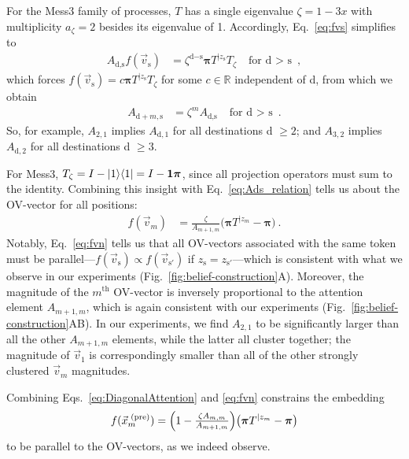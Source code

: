 \documentclass{article}
\theoremstyle{plain}
\theoremstyle{definition}
\theoremstyle{remark}
\newcommand{\stationary}{\boldsymbol{\pi}}
\begin{document}
For the Mess3 family of processes,
$T$ has a single eigenvalue $\zeta = 1-3x$
with multiplicity $a_\zeta = 2$
besides its eigenvalue of 1.
Accordingly, 
Eq.~\eqref{eq:fvs} simplifies to
\begin{align}
A_{\text{d}, \text{s}} f(\vec{v}_\text{s}) &= \zeta^{\text{d}-\text{s}} \stationary
     T^{|z_{\text{s}}} 
     T_\zeta
     &\text{for d $>$ s} ~,
\label{eq:Ads_relation}
\end{align}
which forces $f(\vec{v}_\text{s}) = c \stationary
     T^{|z_{\text{s}}} 
     T_\zeta$
for some $c \in \mathbb{R}$ independent of d,
from which we obtain
\begin{align}
A_{\text{d}+m, \text{s}} &= \zeta^m A_{\text{d}, \text{s}} &\text{for d $>$ s} ~.
\label{eq:Attention_dest_relation}
\end{align}
So, for example, $A_{2,1}$ implies
$A_{\text{d},1}$ for all destinations d $\geq 2$;
and $A_{3,2}$ implies
$A_{\text{d},2}$ for all destinations d $\geq 3$.


For Mess3,
$T_\zeta = I - \ket{1} \! \bra{1} = I - \boldsymbol{1} \stationary$, since all projection operators must sum to the identity.
Combining this insight with 
Eq.~\eqref{eq:Ads_relation}
tells us about the OV-vector for all positions:
\begin{align}
f(\vec{v}_m) 
&= \frac{\zeta}{A_{m+1,m}} \bigl( \stationary
     T^{|z_{m}} - \stationary \bigr)
\label{eq:fvn} ~.
\end{align}
Notably, Eq.~\eqref{eq:fvn} tells us that all OV-vectors associated with the same token must be parallel---$f(\vec{v}_\text{s}) \propto f(\vec{v}_{\text{s}'})$ if $z_\text{s} = z_{\text{s}'}$---which is consistent with what we observe in our experiments (Fig.~\ref{fig:belief-construction}A).  
Moreover, the magnitude of the $m^\text{th}$ OV-vector is inversely proportional to 
the attention element $A_{m+1,m}$,
which is again consistent with our experiments (Fig.~\ref{fig:belief-construction}AB). In our experiments, 
we find $A_{2,1}$ to be significantly larger than all the other $A_{m+1,m}$ elements, while the latter all cluster together; the magnitude of $\vec{v}_1$ is correspondingly smaller than all of the other strongly clustered $\vec{v}_m$ magnitudes.

Combining Eqs.~\eqref{eq:DiagonalAttention}
and \eqref{eq:fvn} constrains the embedding
%
\begin{align}
\label{eq:fpren}
f(\vec{x}_m^\text{ (pre)}) = 
\Bigl( 1 - \tfrac{\zeta A_{m,m}}{A_{m+1,m}} \Bigr) \bigl( \stationary
     T^{|z_{m}} - \stationary \bigr)
\end{align}
to be parallel to the OV-vectors, as we indeed observe.
\end{document}
